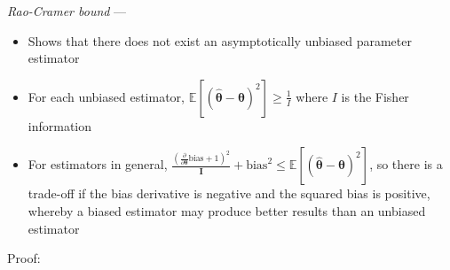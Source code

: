 \emph{Rao-Cramer bound} --- 
\begin{itemize}
    \item Shows that there does not exist an asymptotically unbiased parameter estimator
    \item For each unbiased estimator, $\mathbb{E} [ ( \hat{\boldsymbol{\theta}} - \boldsymbol{\theta} )^2 ] \geq \frac{1}{I}$ where $I$ is the Fisher information
    \item For estimators in general, $\frac{(\frac{\partial}{\partial \boldsymbol{\theta}} \textrm{bias} + 1)^2}{\boldsymbol{I}} + \textrm{bias}^2 \leq \mathbb{E}[(\hat{\boldsymbol{\theta}}-\boldsymbol{\theta})^2]$, so there is a trade-off if the bias derivative is negative and the squared bias is positive, whereby a biased estimator may produce better results than an unbiased estimator
\end{itemize}
Proof: 
